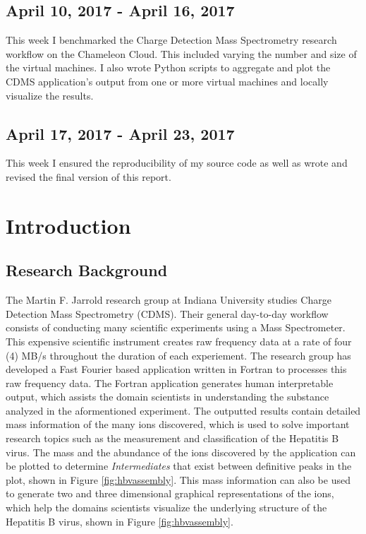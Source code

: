 \documentclass[9pt,twocolumn,twoside]{../../styles/osajnl}
\begin{document}
\subsection{April 10, 2017 - April 16, 2017}
This week I benchmarked the Charge Detection Mass Spectrometry
research workflow on the Chameleon Cloud. This included varying the
number and size of the virtual machines. I also wrote Python scripts
to aggregate and plot the CDMS application's output from one or more
virtual machines and locally visualize the results.
\subsection{April 17, 2017 - April 23, 2017}
This week I ensured the reproducibility of my source code as well as
wrote and revised the final version of this report.

\section{Introduction} \label{introduction}
\subsection{Research Background} \label{research-background}
The Martin F. Jarrold research group at Indiana University studies
Charge Detection Mass Spectrometry (CDMS). Their general day-to-day
workflow consists of conducting many scientific experiments using a
Mass Spectrometer. This expensive scientific instrument creates raw
frequency data at a rate of four (4) MB/s throughout the duration of
each experiement. The research group has developed a Fast Fourier
based application written in Fortran to processes this raw frequency
data. The Fortran application generates human interpretable output,
which assists the domain scientists in understanding the substance
analyzed in the aformentioned experiment. The outputted results
contain detailed mass information of the many ions discovered, which
is used to solve important research topics such as the measurement and
classification of the Hepatitis B virus. The mass and the abundance of
the ions discovered by the application can be plotted to determine
\emph{Intermediates} that exist between definitive peaks in the plot,
shown in Figure \ref{fig:hbvassembly}. This mass information can also
be used to generate two and three dimensional graphical
representations of the ions, which help the domains scientists
visualize the underlying structure of the Hepatitis B virus, shown in
Figure \ref{fig:hbvassembly}.
\end{document}

